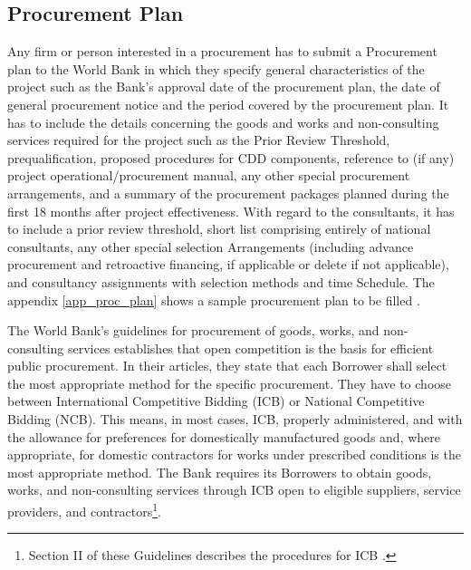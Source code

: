 \subsection{Procurement Plan}

Any firm or person interested in a procurement has to submit a Procurement plan to the World Bank in which they specify general characteristics of the project such as the Bank’s approval date of the procurement plan, the date of general procurement notice and the period covered by the procurement plan. It has to include the details concerning the goods and works and non-consulting services required for the project such as the Prior Review Threshold, prequalification,  proposed procedures for CDD components, reference to (if any) project operational/procurement manual, any other special procurement arrangements, and a summary of the procurement packages planned during the first 18 months after project effectiveness. With regard to the consultants, it has to include a prior review threshold, short list comprising entirely of national consultants, any other special selection Arrangements (including advance procurement and retroactive financing, if applicable or delete if not applicable), and consultancy assignments with selection methods and time Schedule. The appendix \ref{app_proc_plan} shows a sample procurement plan to be filled \parencite{wb_sample_proc}. 


The World Bank's guidelines for procurement of goods, works, and non-consulting services \parencite{wb_g_proc} establishes that open competition is the basis for efficient public procurement.  In their articles, they state that each Borrower shall select the most appropriate method for the specific procurement. They have to choose between International Competitive Bidding (ICB) or National Competitive Bidding (NCB). This means, in most cases, ICB, properly administered, and with the allowance for preferences for domestically manufactured goods and, where appropriate, for domestic contractors for works under prescribed conditions is the most appropriate method. The Bank requires its Borrowers to obtain goods, works, and non-consulting services through ICB open to eligible suppliers, service providers, and contractors\footnote{Section II of these Guidelines describes the procedures for ICB \parencite{wb_g_proc}.}.

